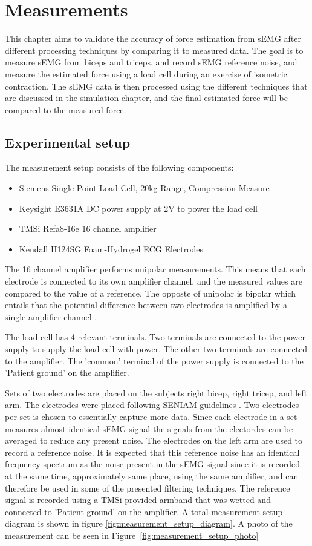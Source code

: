 \chapter{Measurements}
This chapter aims to validate the accuracy of force estimation from sEMG after different processing techniques by comparing it to measured data. The goal is to measure sEMG from biceps and triceps, and record sEMG reference noise, and measure the estimated force using a load cell during an exercise of isometric contraction. The sEMG data is then processed using the different techniques that are discussed in the simulation chapter, and the final estimated force will be compared to the measured force. 

\section{Experimental setup}
The measurement setup consists of the following components:
\begin{itemize}
    \item Siemens Single Point Load Cell, 20kg Range, Compression Measure
    \item Keysight E3631A DC power supply at 2V to power the load cell
    \item TMSi Refa8-16e 16 channel amplifier
    \item Kendall H124SG Foam-Hydrogel ECG Electrodes 
\end{itemize}

The 16 channel amplifier performs unipolar measurements. This means that each electrode is connected to its own amplifier channel, and the measured values are compared to the value of a reference. The opposte of unipolar is bipolar which entails that the potential difference between two electrodes is amplified by a single amplifier channel \cite{tmsi_unipolar_bipolar}. 

The load cell has 4 relevant terminals. Two terminals are connected to the power supply to supply the load cell with power. The other two terminals are connected to the amplifier. The 'common' terminal of the power supply is connected to the 'Patient ground' on the amplifier.

Sets of two electrodes are placed on the subjects right bicep, right tricep, and left arm. The electrodes were placed following SENIAM guidelines \cite{seniam}. Two electrodes per set is chosen to essentially capture more data. Since each electrode in a set measures almost identical sEMG signal the signals from the electordes can be averaged to reduce any present noise. The electrodes on the left arm are used to record a reference noise. It is expected that this reference noise has an identical frequency spectrum as the noise present in the sEMG signal since it is recorded at the same time, approximately same place, using the same amplifier, and can therefore be used in some of the presented filtering techniques. The reference signal is recorded using a TMSi provided armband that was wetted and connected to 'Patient ground' on the amplifier. A total measurement setup diagram is shown in figure \ref{fig:measurement_setup_diagram}. A photo of the measurement can be seen in Figure~\ref{fig:measurement_setup_photo}

